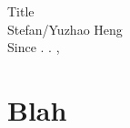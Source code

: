 \documentclass[12pt]{article}
\newlength\tindent
\renewcommand{\indent}{\hspace*{\tindent}}
\newcommand{\mydate}{\shortdayofweekname{\day}{\month}{\year}. \shortmonthname. \nth{\day}, \the\year{}}
\begin{document}
\begin{center}
    \Large Title \vspace{0.2cm} \\
    \large Stefan/Yuzhao Heng \vspace{0.2cm} \\
    \normalsize Since \mydate
\end{center}



\section*{Blah}
\indent \lipsum[1]

\indent \lipsum[2]

\indent \lipsum[3]
\end{document}
